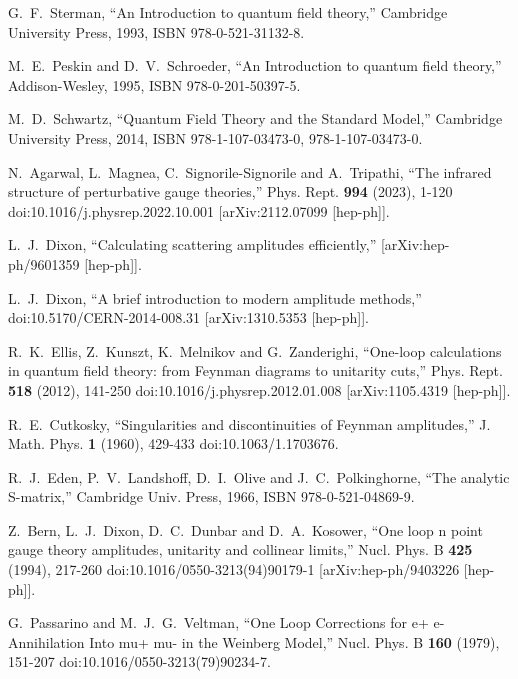 G.~F.~Sterman,
``An Introduction to quantum field theory,''
Cambridge University Press, 1993,
ISBN 978-0-521-31132-8.

M.~E.~Peskin and D.~V.~Schroeder,
``An Introduction to quantum field theory,''
Addison-Wesley, 1995,
ISBN 978-0-201-50397-5.

M.~D.~Schwartz,
``Quantum Field Theory and the Standard Model,''
Cambridge University Press, 2014,
ISBN 978-1-107-03473-0, 978-1-107-03473-0.

N.~Agarwal, L.~Magnea, C.~Signorile-Signorile and A.~Tripathi,
``The infrared structure of perturbative gauge theories,''
Phys. Rept. \textbf{994} (2023), 1-120
doi:10.1016/j.physrep.2022.10.001
[arXiv:2112.07099 [hep-ph]].

L.~J.~Dixon,
``Calculating scattering amplitudes efficiently,''
[arXiv:hep-ph/9601359 [hep-ph]].

L.~J.~Dixon,
``A brief introduction to modern amplitude methods,''
doi:10.5170/CERN-2014-008.31
[arXiv:1310.5353 [hep-ph]].

R.~K.~Ellis, Z.~Kunszt, K.~Melnikov and G.~Zanderighi,
``One-loop calculations in quantum field theory: from Feynman diagrams to unitarity cuts,''
Phys. Rept. \textbf{518} (2012), 141-250
doi:10.1016/j.physrep.2012.01.008
[arXiv:1105.4319 [hep-ph]].

R.~E.~Cutkosky,
``Singularities and discontinuities of Feynman amplitudes,''
J. Math. Phys. \textbf{1} (1960), 429-433
doi:10.1063/1.1703676.

R.~J.~Eden, P.~V.~Landshoff, D.~I.~Olive and J.~C.~Polkinghorne,
``The analytic S-matrix,''
Cambridge Univ. Press, 1966,
ISBN 978-0-521-04869-9.

Z.~Bern, L.~J.~Dixon, D.~C.~Dunbar and D.~A.~Kosower,
``One loop n point gauge theory amplitudes, unitarity and collinear limits,''
Nucl. Phys. B \textbf{425} (1994), 217-260
doi:10.1016/0550-3213(94)90179-1
[arXiv:hep-ph/9403226 [hep-ph]].

G.~Passarino and M.~J.~G.~Veltman,
``One Loop Corrections for e+ e- Annihilation Into mu+ mu- in the Weinberg Model,''
Nucl. Phys. B \textbf{160} (1979), 151-207
doi:10.1016/0550-3213(79)90234-7.

